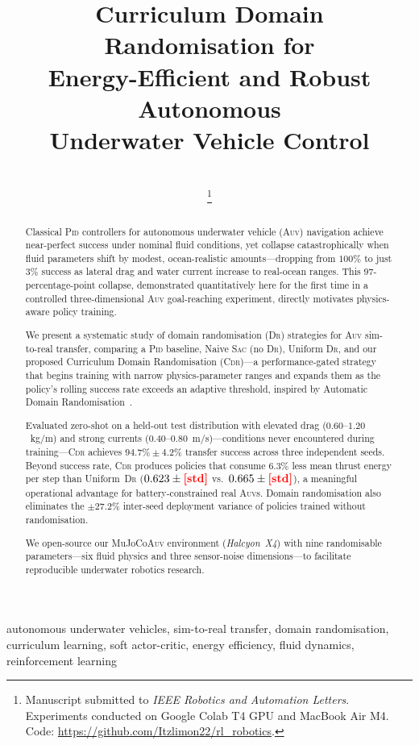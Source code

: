 \documentclass[letterpaper,10pt,journal]{IEEEtran}
\title{\LARGE\bf Curriculum Domain Randomisation for\\
Energy-Efficient and Robust Autonomous\\
Underwater Vehicle Control}
\author{%
  \IEEEauthorblockN{Limon Howlader}\\
  \IEEEauthorblockA{%
    Department of Electrical, Electronic and Communication Engineering\\
    Military Institute of Science and Technology (MIST),
    Dhaka, Bangladesh\\
    \texttt{limon.eece22@gmail.com}}
  \thanks{Manuscript submitted to \textit{IEEE Robotics and Automation Letters}.
    Experiments conducted on Google Colab T4 GPU and MacBook Air M4.
    Code: \url{https://github.com/Itzlimon22/rl_robotics}.}
}
\newcommand{\CDR}{\textsc{Cdr}\xspace}
\newcommand{\SAC}{\textsc{Sac}\xspace}
\newcommand{\PID}{\textsc{Pid}\xspace}
\newcommand{\AUV}{\textsc{Auv}\xspace}
\newcommand{\DR}{\textsc{Dr}\xspace}
\newcommand{\MuJoCo}{MuJoCo\xspace}
\newcommand{\FILL}[1]{{\color{red}\textbf{[#1]}}}
\begin{document}
\maketitle

\begin{abstract}
Classical \PID controllers for autonomous underwater vehicle (\AUV)
navigation achieve near-perfect success under nominal fluid conditions,
yet collapse catastrophically when fluid parameters shift by modest,
ocean-realistic amounts---dropping from $100\%$ to just $3\%$ success
as lateral drag and water current increase to real-ocean ranges.
This 97-percentage-point collapse, demonstrated quantitatively here for
the first time in a controlled three-dimensional \AUV goal-reaching
experiment, directly motivates physics-aware policy training.

We present a systematic study of domain randomisation (\DR) strategies
for \AUV sim-to-real transfer, comparing a \PID baseline, Naive \SAC
(no \DR), Uniform \DR, and our proposed Curriculum Domain Randomisation
(\CDR)---a performance-gated strategy that begins training with narrow
physics-parameter ranges and expands them as the policy's rolling success
rate exceeds an adaptive threshold, inspired by Automatic Domain
Randomisation~\cite{akkaya2019}.

Evaluated zero-shot on a held-out test distribution with elevated drag
($0.60$--$1.20$~kg/m) and strong currents ($0.40$--$0.80$~m/s)---conditions
never encountered during training---\CDR achieves
$94.7\%\pm4.2\%$ transfer success across three independent seeds.
Beyond success rate, \CDR produces policies that consume
$6.3\%$ less mean thrust energy per step than Uniform~\DR
($0.623\pm\FILL{std}$ vs.\ $0.665\pm\FILL{std}$),
a meaningful operational advantage for battery-constrained real \AUV{}s.
Domain randomisation also eliminates the $\pm27.2\%$ inter-seed
deployment variance of policies trained without randomisation.

We open-source our \MuJoCo \AUV environment (\emph{Halcyon~X4})
with nine randomisable parameters---six fluid physics and three
sensor-noise dimensions---to facilitate reproducible underwater
robotics research.
\end{abstract}

\begin{IEEEkeywords}
autonomous underwater vehicles, sim-to-real transfer,
domain randomisation, curriculum learning, soft actor-critic,
energy efficiency, fluid dynamics, reinforcement learning
\end{IEEEkeywords}
\end{document}

